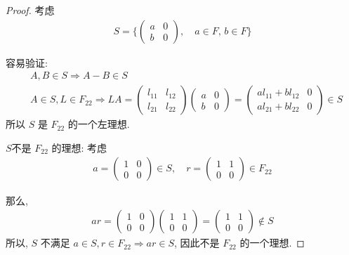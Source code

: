 \documentclass[utf8]{ctexbook}
\theoremstyle{definition}
\begin{document}
\begin{proof}
考虑 
\begin{align*}
S = \{ \left( 
\begin{array}{cc}
a & 0 \\
b & 0
\end{array}
\right), \quad a \in F, \, b \in F \}
\end{align*}

容易验证:
\begin{align*}
& A, B \in S \Longrightarrow A- B \in S \\
& A \in S, L \in F_{22} \Longrightarrow L A = \left( \begin{array}{cc}
l_{11} & l_{12} \\
l_{21} & l_{22}
\end{array} 
\right)
\left( 
\begin{array}{cc}
a & 0 \\
b & 0
\end{array}
\right)
=
\left( 
\begin{array}{cc}
a l_{11} + b l_{12} & 0 \\
a l_{21} + b l_{22} & 0
\end{array}
\right)
\in S
\end{align*}
所以 $S$ 是 $F_{22}$ 的一个左理想.

$S$不是 $F_{22}$ 的理想: 考虑
\begin{align*}
a = \left( 
\begin{array}{cc}
1 & 0 \\
0 & 0
\end{array}
\right) \in S, \quad 
r = \left( 
\begin{array}{cc}
1 & 1 \\
0 & 0
\end{array}
\right) \in F_{22}
\end{align*}

那么,
\begin{align*}
a r = \left( 
\begin{array}{cc}
1 & 0 \\
0 & 0
\end{array}
\right) 
\left( 
\begin{array}{cc}
1 & 1 \\
0 & 0
\end{array}
\right) 
= 
\left( 
\begin{array}{cc}
1 & 1 \\
0 & 0
\end{array}
\right) 
\not \in S
\end{align*}
所以, $S$ 不满足 $a \in S,  r \in F_{22} \Longrightarrow ar \in S$, 因此不是 $F_{22}$ 的一个理想.

\end{proof}
\end{document}
